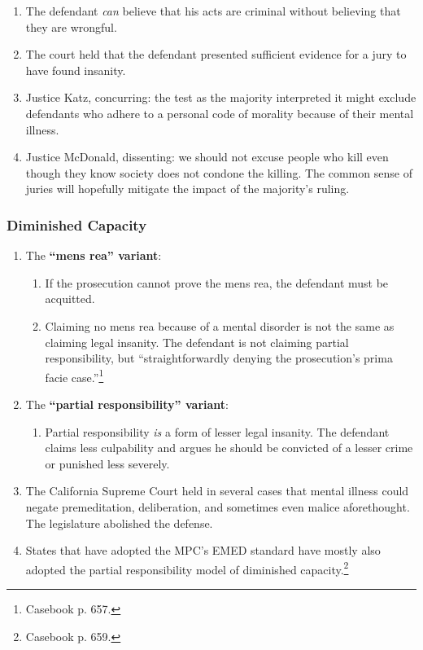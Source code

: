 \begin{enumerate}
    \item The defendant \emph{can} believe that his acts are criminal without 
    believing that they are wrongful.
    \item The court held that the defendant presented sufficient evidence for 
    a jury to have found insanity.
    \item Justice Katz, concurring: the test as the majority interpreted it 
    might exclude defendants who adhere to a personal code of morality because 
    of their mental illness.
    \item Justice McDonald, dissenting: we should not excuse people who kill 
    even though they know society does not condone the killing. The common 
    sense of juries will hopefully mitigate the impact of the majority's 
    ruling.
\end{enumerate}

\subsubsection{Diminished Capacity}

\begin{enumerate}
    \item The \textbf{``mens rea'' variant}:
    \begin{enumerate}
        \item If the prosecution cannot prove the mens rea, the defendant must be acquitted.
        \item Claiming no mens rea because of a mental disorder is not the same as claiming legal insanity. The defendant is not claiming partial responsibility, but ``straightforwardly denying the prosecution's prima facie case.''\footnote{Casebook p. 657.}
    \end{enumerate}
    \item The \textbf{``partial responsibility'' variant}:
    \begin{enumerate}
        \item Partial responsibility \emph{is} a form of lesser legal insanity. The defendant claims less culpability and argues he should be convicted of a lesser crime or punished less severely.
    \end{enumerate}
    \item The California Supreme Court held in several cases that mental illness could negate premeditation, deliberation, and sometimes even malice aforethought. The legislature abolished the defense.
    \item States that have adopted the MPC's EMED standard have mostly also adopted the partial responsibility model of diminished capacity.\footnote{Casebook p. 659.}
\end{enumerate}

